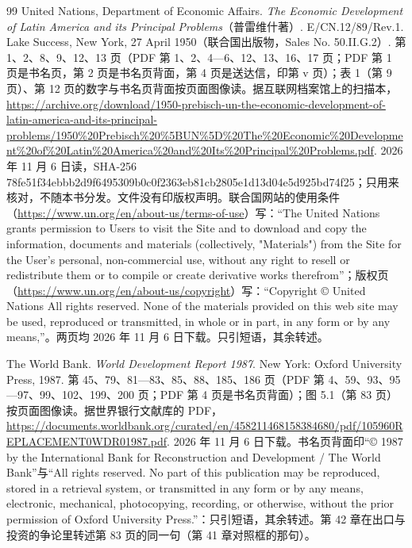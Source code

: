 \begin{thebibliography}{99}
 United Nations, Department of Economic Affairs. \emph{The Economic Development of Latin America and its Principal Problems}（普雷维什著）. E/CN.12/89/Rev.1. Lake Success, New York, 27 April 1950（联合国出版物，Sales No. 50.II.G.2）. 第 1、2、8、9、12、13 页（PDF 第 1、2、4—6、12、13、16、17 页；PDF 第 1 页是书名页，第 2 页是书名页背面，第 4 页是送达信，印第 v 页）；表 1（第 9 页）、第 12 页的数字与书名页背面按页面图像读。据互联网档案馆上的扫描本，\url{https://archive.org/download/1950-prebisch-un-the-economic-development-of-latin-america-and-its-principal-problems/1950\%20Prebisch\%20\%5BUN\%5D\%20The\%20Economic\%20Development\%20of\%20Latin\%20America\%20and\%20Its\%20Principal\%20Problems.pdf}. 2026 年 11 月 6 日读，SHA-256 78fe51f34ebbb2d9f6495309b0c0f2363eb81cb2805e1d13d04e5d925bd74f25；只用来核对，不随本书分发。文件没有印版权声明。联合国网站的使用条件（\url{https://www.un.org/en/about-us/terms-of-use}）写：“The United Nations grants permission to Users to visit the Site and to download and copy the information, documents and materials (collectively, "Materials") from the Site for the User's personal, non-commercial use, without any right to resell or redistribute them or to compile or create derivative works therefrom”；版权页（\url{https://www.un.org/en/about-us/copyright}）写：“Copyright © United Nations All rights reserved. None of the materials provided on this web site may be used, reproduced or transmitted, in whole or in part, in any form or by any means,”。两页均 2026 年 11 月 6 日下载。只引短语，其余转述。

 The World Bank. \emph{World Development Report 1987}. New York: Oxford University Press, 1987. 第 45、79、81—83、85、88、185、186 页（PDF 第 4、59、93、95—97、99、102、199、200 页；PDF 第 4 页是书名页背面）；图 5.1（第 83 页）按页面图像读。据世界银行文献库的 PDF，\url{https://documents.worldbank.org/curated/en/458211468158384680/pdf/105960REPLACEMENT0WDR01987.pdf}. 2026 年 11 月 6 日下载。书名页背面印“© 1987 by the International Bank for Reconstruction and Development / The World Bank”与“All rights reserved. No part of this publication may be reproduced, stored in a retrieval system, or transmitted in any form or by any means, electronic, mechanical, photocopying, recording, or otherwise, without the prior permission of Oxford University Press.”：只引短语，其余转述。第 42 章在出口与投资的争论里转述第 83 页的同一句（第 41 章对照框的那句）。


\end{thebibliography}
